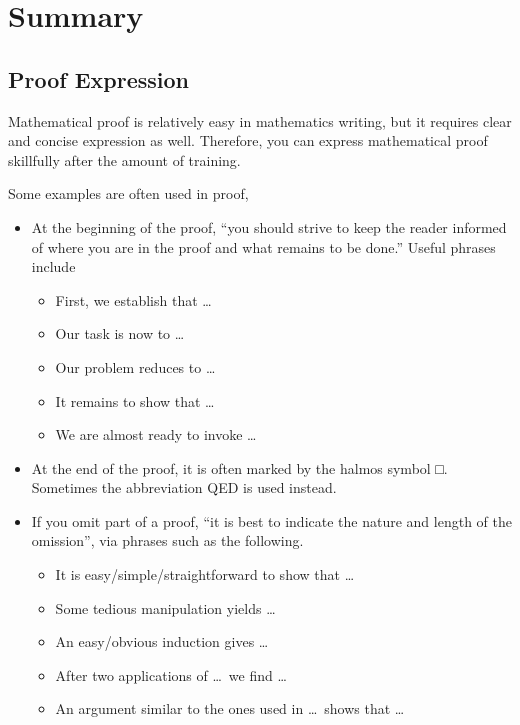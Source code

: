 \section{Summary}
\subsection{Proof Expression}
Mathematical proof is relatively easy in mathematics writing, but it requires clear and concise expression as well. Therefore, you can express mathematical proof skillfully after the amount of training.

Some examples are often used in proof\cite{Nicholas1998Handbook},
\begin{itemize}
	\item At the beginning of the proof, ``you should strive to keep the reader informed of where you are in the proof and what remains to be done.'' Useful phrases include
		\begin{itemize}
			\item First, we establish that \ldots
			\item Our task is now to \ldots
			\item Our problem reduces to \ldots
			\item It remains to show that \ldots
			\item We are almost ready to invoke \ldots
		\end{itemize}
	\item At the end of the proof, it is often marked by the halmos symbol □. Sometimes the abbreviation QED is used instead.
	\item If you omit part of a proof, ``it is best to indicate the nature and length of the omission'', via phrases such as the following.
		\begin{itemize}
			\item It is easy/simple/straightforward to show that \ldots
			\item Some tedious manipulation yields \ldots
			\item An easy/obvious induction gives \ldots
			\item After two applications of \ldots\ we find \ldots
			\item An argument similar to the ones used in \ldots\ shows that \ldots
		\end{itemize}
\end{itemize}


